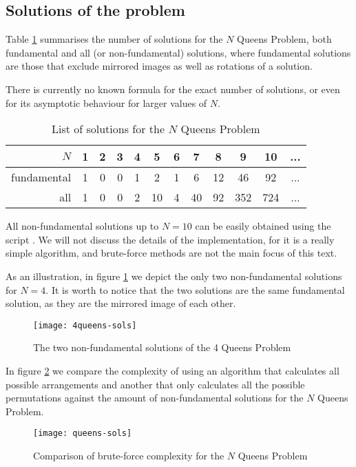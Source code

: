 \subsection{Solutions of the problem}

Table \ref{tab:all-sols} summarises the number of solutions for the $N$ Queens Problem, both fundamental and all (or non-fundamental) solutions, where fundamental solutions are those that exclude mirrored images as well as rotations of a solution.

There is currently no known formula for the exact number of solutions, or even for its asymptotic behaviour for larger values of $N$.
\begin{table}[H]
	\centering
	\begin{tabular}{r | ccccccccccc}
		\toprule
		\toprule
		$N$         & 1 & 2 & 3 & 4 & 5 & 6 & 7 & 8 & 9 & 10 & ... \\
		\midrule
		fundamental & 1 & 0 & 0 & 1 & 2 & 1 & 6 & 12 & 46 & 92 & ... \\
		all         & 1 & 0 & 0 & 2 & 10 & 4 & 40 & 92 & 352 & 724 & ... \\
		\bottomrule
	\end{tabular}
	\caption{List of solutions for the $N$ Queens Problem}
	\label{tab:all-sols}
\end{table}

All non-fundamental solutions up to $N = 10$ can be easily obtained using the script . We will not discuss the details of the implementation, for it is a really simple algorithm, and brute-force methods are not the main focus of this text.

As an illustration, in figure \ref{fig:4queens-sols} we depict the only two non-fundamental solutions for $N = 4$. It is worth to notice that the two solutions are the same fundamental solution, as they are the mirrored image of each other.

\begin{figure}[H]
	\centering
	\texttt{[image: 4queens-sols]}
	\caption{The two non-fundamental solutions of the 4 Queens Problem}
	\label{fig:4queens-sols}
\end{figure}

In figure \ref{fig:queens-sols} we compare the complexity of using an algorithm that calculates all possible arrangements and another that only calculates all the possible permutations against the amount of non-fundamental solutions for the $N$ Queens Problem.
\begin{figure}[H]
	\centering
	\texttt{[image: queens-sols]}
	\caption{Comparison of brute-force complexity for the $N$ Queens Problem}
	\label{fig:queens-sols}
\end{figure}

